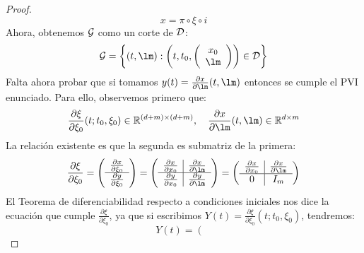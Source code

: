 \begin{proof}
    \begin{equation*}
        x = \pi \circ \xi \circ i
    \end{equation*}
    Ahora, obtenemos $\mathcal{G}$ como un corte de $\mathcal{D}$:
    \begin{equation*}
        \cc{G} = \left\{(t,\lm) : \left(t,t_0,\left(\begin{array}{cc}
            x_0 \\
            \lm 
        \end{array}\right)\right)\in \cc{D}\right\}
    \end{equation*}
    Falta ahora probar que si tomamos $y(t) = \frac{\partial x}{\partial \lm}(t,\lm)$ entonces se cumple el PVI enunciado. Para ello, observemos primero que:
    \begin{equation*}
        \frac{\partial \xi}{\partial \xi_0}(t;t_0,\xi_0)\in \mathbb{R}^{(d+m)\times(d+m)}, \quad \frac{\partial x}{\partial \lm}(t,\lm)\in \mathbb{R}^{d\times m}
    \end{equation*}
    La relación existente es que la segunda es submatriz de la primera:
    \begin{equation*}
        \frac{\partial \xi}{\partial \xi_0} = \left(\begin{array}{cc}
            \frac{\partial x}{\partial \xi_0} \\
            \hline 
             \frac{\partial y}{\partial \xi_0}
        \end{array}\right) = \left(\begin{array}{c|c}
            \frac{\partial x}{\partial x_0} & \frac{\partial x}{\partial \lm} \\
            \hline
            \frac{\partial y}{\partial x_0} & \frac{\partial y}{\partial \lm} 
        \end{array}\right) = \left(\begin{array}{c|c}
            \frac{\partial x}{\partial x_0} & \frac{\partial x}{\partial \lm} \\
            \hline
             0 &  I_m
        \end{array}\right)
    \end{equation*}
    El Teorema de diferenciabilidad respecto a condiciones iniciales nos dice la ecuación que cumple $\frac{\partial \xi}{\partial \xi_0}$, ya que si escribimos $Y(t) = \frac{\partial \xi}{\partial \xi_0}(t;t_0,\xi_0)$, tendremos:
    \begin{equation*}
        Y(t) = \left(\begin{array}{c|c}

\end{array}
\end{equation*}
\end{proof}
